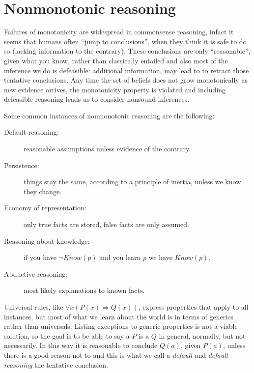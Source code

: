 \section{Nonmonotonic reasoning}
Failures of monotonicity are widespread in commonsense reasoning, infact it seems
that humans often “jump to conclusions”, when they think it is safe to do so
(lacking information to the contrary).\newline
These conclusions are only “reasonable”, given what you know, rather than
classically entailed and also most of the inference we do is defeasible:
additional information, may lead to to retract those tentative conclusions.\newline
Any time the set of beliefs does not grow monotonically as new evidence arrives,
the monotonicity property is violated and including defeasible reasoning
leads us to consider nonsound inferences.

Some common instances of nonmonotonic reasoning are the following:
\begin{description}
   \item [Default reasoning: ] reasonable assumptions unless evidence of the contrary
   \item [Persistence: ] things stay the same, according to a principle of inertia,
	                 unless we know they change.
   \item [Economy of representation: ] only true facts are stored, false facts are only
                                       assumed.
   \item [Reasoning about knowledge:] if you have $\neg Know(p)$ and you learn $p$ we
	                              have $Know(p)$.
   \item [Abductive reasoning: ] most likely explanations to known facts.
\end{description}
Universal rules, like $\forall x (P(x) \Rightarrow Q(x))$, express properties that
apply to all instances, but most of what we learn about the world is 
in terms of generics rather than universals.\newline
Listing exceptions to generic properties is not a viable solution, so the goal is to 
be able to say a $P$ is a $Q$ in general, normally, but not necessarily.\newline
In this way it is reasonable to conclude $Q(a)$, given $P(a)$, 
unless there is a good reason not to and this is what we call a \emph{default}
and \emph{default reasoning} the tentative conclusion.

